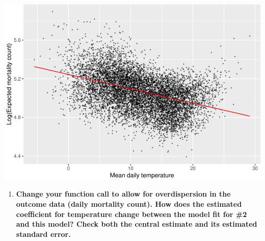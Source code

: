 \documentclass[
]{book}
\newenvironment{Shaded}{\begin{snugshade}}{\end{snugshade}}
\newcommand{\DataTypeTok}[1]{\textcolor[rgb]{0.13,0.29,0.53}{#1}}
\newcommand{\FloatTok}[1]{\textcolor[rgb]{0.00,0.00,0.81}{#1}}
\newcommand{\KeywordTok}[1]{\textcolor[rgb]{0.13,0.29,0.53}{\textbf{#1}}}
\newcommand{\NormalTok}[1]{#1}
\newcommand{\OperatorTok}[1]{\textcolor[rgb]{0.81,0.36,0.00}{\textbf{#1}}}
\newcommand{\StringTok}[1]{\textcolor[rgb]{0.31,0.60,0.02}{#1}}
\providecommand{\tightlist}{%
  \setlength{\itemsep}{0pt}\setlength{\parskip}{0pt}}
\begin{document}
\begin{Shaded}
\end{Shaded}

\includegraphics{adv_epi_analysis_files/figure-latex/unnamed-chunk-31-1.pdf}

\begin{enumerate}
\def\labelenumi{\arabic{enumi}.}
\setcounter{enumi}{2}
\tightlist
\item
  \textbf{Change your function call to allow for overdispersion in the outcome data
  (daily mortality count). How does the estimated coefficient for temperature
  change between the model fit for \#2 and this model? Check both the central
  estimate and its estimated standard error.}
\end{enumerate}
\end{document}
